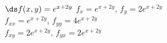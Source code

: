 {$\ds f(x,y) = e^{x+2y}$
}
{$f_x=e^{x+2y}$, $f_y=2e^{x+2y}$\\
$f_{xx}=e^{x+2y}$, $f_{yy}=4e^{x+2y}$\\
$f_{xy}=2e^{x+2y}$, $f_{yx}=2e^{x+2y}$\\
}